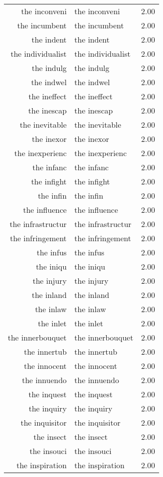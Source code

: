 \begin{table}[ht]
\begin{tabular}{rlr}
  the inconveni & the inconveni & 2.00 \\ 
  the incumbent & the incumbent & 2.00 \\ 
  the indent & the indent & 2.00 \\ 
  the individualist & the individualist & 2.00 \\ 
  the indulg & the indulg & 2.00 \\ 
  the indwel & the indwel & 2.00 \\ 
  the ineffect & the ineffect & 2.00 \\ 
  the inescap & the inescap & 2.00 \\ 
  the inevitable & the inevitable & 2.00 \\ 
  the inexor & the inexor & 2.00 \\ 
  the inexperienc & the inexperienc & 2.00 \\ 
  the infanc & the infanc & 2.00 \\ 
  the infight & the infight & 2.00 \\ 
  the infin & the infin & 2.00 \\ 
  the influence & the influence & 2.00 \\ 
  the infrastructur & the infrastructur & 2.00 \\ 
  the infringement & the infringement & 2.00 \\ 
  the infus & the infus & 2.00 \\ 
  the iniqu & the iniqu & 2.00 \\ 
  the injury & the injury & 2.00 \\ 
  the inland & the inland & 2.00 \\ 
  the inlaw & the inlaw & 2.00 \\ 
  the inlet & the inlet & 2.00 \\ 
  the innerbouquet & the innerbouquet & 2.00 \\ 
  the innertub & the innertub & 2.00 \\ 
  the innocent & the innocent & 2.00 \\ 
  the innuendo & the innuendo & 2.00 \\ 
  the inquest & the inquest & 2.00 \\ 
  the inquiry & the inquiry & 2.00 \\ 
  the inquisitor & the inquisitor & 2.00 \\ 
  the insect & the insect & 2.00 \\ 
  the insouci & the insouci & 2.00 \\ 
  the inspiration & the inspiration & 2.00 \\ 

\end{tabular}
\end{table}

